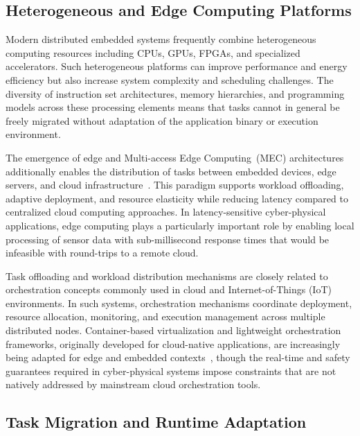 \subsection{Heterogeneous and Edge Computing Platforms}
\label{subsec:hetero_edge}

Modern distributed embedded systems frequently combine
heterogeneous computing resources including CPUs, GPUs,
FPGAs, and specialized accelerators. Such heterogeneous
platforms can improve performance and energy efficiency but
also increase system complexity and scheduling challenges.
The diversity of instruction set architectures, memory
hierarchies, and programming models across these processing
elements means that tasks cannot in general be freely
migrated without adaptation of the application binary or
execution environment.

The emergence of edge and Multi-access Edge Computing~(MEC)
architectures additionally enables the distribution of tasks
between embedded devices, edge servers, and cloud
infrastructure~\cite{mec2017}. This paradigm supports
workload offloading, adaptive deployment, and resource
elasticity while reducing latency compared to centralized
cloud computing approaches. In latency-sensitive
cyber-physical applications, edge computing plays a
particularly important role by enabling local processing
of sensor data with sub-millisecond response times that
would be infeasible with round-trips to a remote cloud.

Task offloading and workload distribution mechanisms are
closely related to orchestration concepts commonly used in
cloud and Internet-of-Things (IoT) environments. In such
systems, orchestration mechanisms coordinate deployment,
resource allocation, monitoring, and execution management
across multiple distributed nodes. Container-based
virtualization and lightweight orchestration frameworks,
originally developed for cloud-native applications, are
increasingly being adapted for edge and embedded
contexts~\cite{morabito2018}, though the real-time and
safety guarantees required in cyber-physical systems
impose constraints that are not natively addressed by
mainstream cloud orchestration tools.

\subsection{Task Migration and Runtime Adaptation}
\label{subsec:taskmig}

